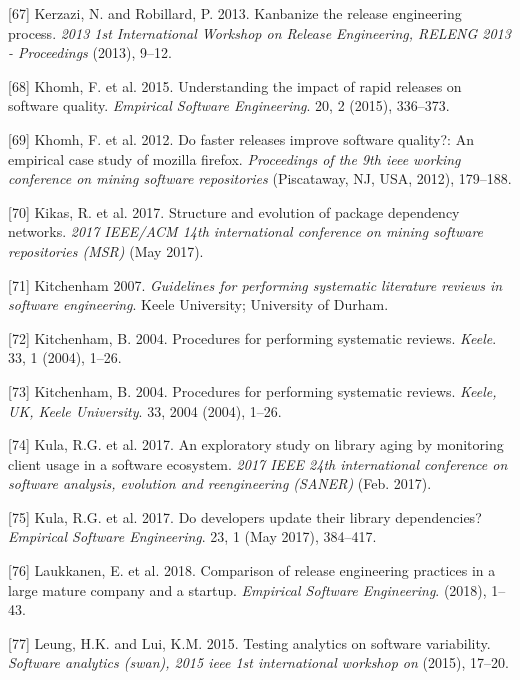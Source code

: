 \documentclass[]{book}
\begin{document}
\hypertarget{ref-kerzazi2013a}{}
{[}67{]} Kerzazi, N. and Robillard, P. 2013. Kanbanize the release
engineering process. \emph{2013 1st International Workshop on Release
Engineering, RELENG 2013 - Proceedings} (2013), 9--12.

\hypertarget{ref-khomh2015a}{}
{[}68{]} Khomh, F. et al. 2015. Understanding the impact of rapid
releases on software quality. \emph{Empirical Software Engineering}. 20,
2 (2015), 336--373.

\hypertarget{ref-khomh2012a}{}
{[}69{]} Khomh, F. et al. 2012. Do faster releases improve software
quality?: An empirical case study of mozilla firefox. \emph{Proceedings
of the 9th ieee working conference on mining software repositories}
(Piscataway, NJ, USA, 2012), 179--188.

\hypertarget{ref-Kikas2017}{}
{[}70{]} Kikas, R. et al. 2017. Structure and evolution of package
dependency networks. \emph{2017 IEEE/ACM 14th international conference
on mining software repositories (MSR)} (May 2017).

\hypertarget{ref-kitchenham2007}{}
{[}71{]} Kitchenham 2007. \emph{Guidelines for performing systematic
literature reviews in software engineering}. Keele University;
University of Durham.

\hypertarget{ref-Kitchenham2004}{}
{[}72{]} Kitchenham, B. 2004. Procedures for performing systematic
reviews. \emph{Keele}. 33, 1 (2004), 1--26.

\hypertarget{ref-kitchenham2004procedures}{}
{[}73{]} Kitchenham, B. 2004. Procedures for performing systematic
reviews. \emph{Keele, UK, Keele University}. 33, 2004 (2004), 1--26.

\hypertarget{ref-Kula2017-2}{}
{[}74{]} Kula, R.G. et al. 2017. An exploratory study on library aging
by monitoring client usage in a software ecosystem. \emph{2017 IEEE 24th
international conference on software analysis, evolution and
reengineering (SANER)} (Feb. 2017).

\hypertarget{ref-Kula2017}{}
{[}75{]} Kula, R.G. et al. 2017. Do developers update their library
dependencies? \emph{Empirical Software Engineering}. 23, 1 (May 2017),
384--417.

\hypertarget{ref-laukkanen2018a}{}
{[}76{]} Laukkanen, E. et al. 2018. Comparison of release engineering
practices in a large mature company and a startup. \emph{Empirical
Software Engineering}. (2018), 1--43.

\hypertarget{ref-leung2015testing}{}
{[}77{]} Leung, H.K. and Lui, K.M. 2015. Testing analytics on software
variability. \emph{Software analytics (swan), 2015 ieee 1st
international workshop on} (2015), 17--20.
\end{document}
